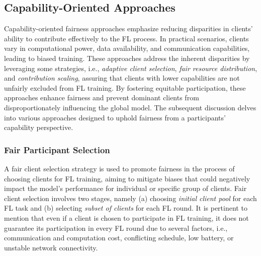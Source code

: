 \documentclass{article}
\begin{document}
\subsection{Capability-Oriented Approaches}
\label{Sub_sec: Capability-Oriented}
Capability-oriented fairness approaches emphasize reducing disparities in clients' ability to contribute effectively to the FL process. In practical scenarios, clients vary in computational power, data availability, and communication capabilities, leading to biased training. These approaches address the inherent disparities by leveraging some strategies, i.e., \emph{adaptive client selection}, \emph{fair resource distribution}, and \emph{contribution scaling}, assuring that clients with lower capabilities are not unfairly excluded from FL training. By fostering equitable participation, these approaches enhance fairness and prevent dominant clients from disproportionately influencing the global model. The subsequent discussion delves into various approaches designed to uphold fairness from a participants' capability perspective.

 \subsubsection{Fair Participant Selection}
\label{Subsub_sec: Fair Participant Selection}
A fair client selection strategy is used to promote fairness in the process of choosing clients for FL training, aiming to mitigate biases that could negatively impact the model’s performance for individual or specific group of clients. Fair client selection involves two stages, namely (a) choosing \textit{initial client pool} for each FL task and (b) selecting \textit{subset of clients} for each FL round. It is pertinent to mention that even if a client is chosen to participate in FL training, it does not guarantee its participation in every FL round due to several factors, i.e., communication and computation cost, conflicting schedule, low battery, or unstable network connectivity.
\end{document}
